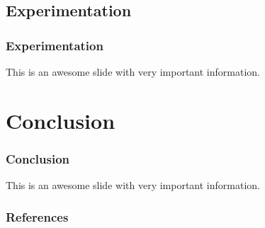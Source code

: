 \documentclass[10pt, aspectratio=169]{beamer}
\begin{document}
\subsection{Experimentation}
\begin{frame}
    \frametitle{Experimentation}
    \begin{outline}
        \1 This is an awesome slide with very important information. 
    \end{outline}
\end{frame}
\section{Conclusion}
\begin{frame}
    \frametitle{Conclusion}
    \begin{outline}
        \1 This is an awesome slide with very important information. 
    \end{outline}
\end{frame}
\begin{frame}
    \frametitle{References}
    {\scriptsize
    
    
    }
\end{frame}
\end{document}
